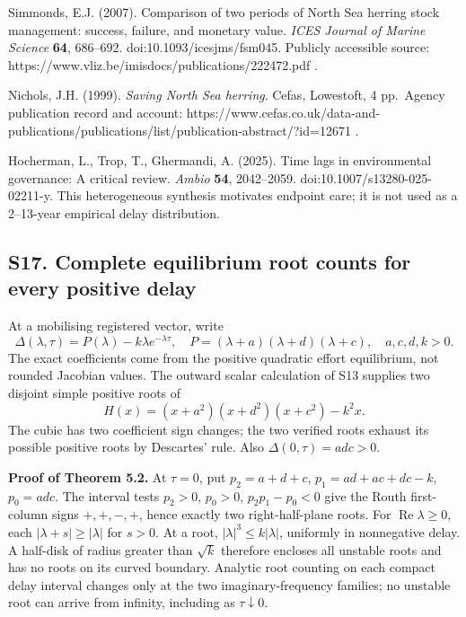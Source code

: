 \documentclass[
  10pt,
  a4paper,
]{article}
\begin{document}
Simmonds, E.J. (2007). Comparison of two periods of North Sea herring
stock management: success, failure, and monetary value. \emph{ICES
Journal of Marine Science} \textbf{64}, 686--692.
doi:10.1093/icesjms/fsm045. Publicly accessible source:
https://www.vliz.be/imisdocs/publications/222472.pdf .

Nichols, J.H. (1999). \emph{Saving North Sea herring}. Cefas, Lowestoft,
4 pp.~Agency publication record and account:
https://www.cefas.co.uk/data-and-publications/publications/list/publication-abstract/?id=12671
.

Hocherman, L., Trop, T., Ghermandi, A. (2025). Time lags in
environmental governance: A critical review. \emph{Ambio} \textbf{54},
2042--2059. doi:10.1007/s13280-025-02211-y. This heterogeneous synthesis
motivates endpoint care; it is not used as a 2--13-year empirical delay
distribution.

\subsection{S17. Complete equilibrium root counts for every positive
delay}\label{s17.-complete-equilibrium-root-counts-for-every-positive-delay}

At a mobilising registered vector, write
\[\Delta(\lambda,\tau)=P(\lambda)-k\lambda e^{-\lambda\tau},\quad P=(\lambda+a)(\lambda+d)(\lambda+c),\quad a,c,d,k>0.\]
The exact coefficients come from the positive quadratic effort
equilibrium, not rounded Jacobian values. The outward scalar calculation
of S13 supplies two disjoint simple positive roots of
\[H(x)=(x+a^2)(x+d^2)(x+c^2)-k^2x.\] The cubic has two coefficient sign
changes; the two verified roots exhaust its possible positive roots by
Descartes' rule. Also \(\Delta(0,\tau)=adc>0\).

\textbf{Proof of Theorem 5.2.} At \(\tau=0\), put \(p_2=a+d+c\),
\(p_1=ad+ac+dc-k\), \(p_0=adc\). The interval tests \(p_2>0\),
\(p_0>0\), \(p_2p_1-p_0<0\) give the Routh first-column signs
\(+,+,-,+\), hence exactly two right-half-plane roots. For
\(\operatorname{Re}\lambda\ge0\), each \(|\lambda+s|\ge|\lambda|\) for
\(s>0\). At a root, \(|\lambda|^3\le k|\lambda|\), uniformly in
nonnegative delay. A half-disk of radius greater than \(\sqrt{k}\)
therefore encloses all unstable roots and has no roots on its curved
boundary. Analytic root counting on each compact delay interval changes
only at the two imaginary-frequency families; no unstable root can
arrive from infinity, including as \(\tau\downarrow0\).
\end{document}
